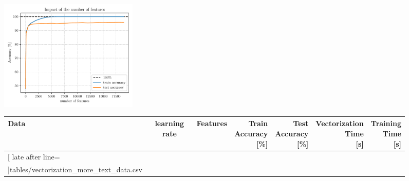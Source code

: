 \documentclass[10pt]{article}
\begin{document}
	\begin{figure}[htbp]
		\centering
		\begin{minipage}[t]{0.35\textwidth}
			\centering
			\vspace{0pt} %
			\includegraphics[height=5.3cm]{figures/vectorization_comparison_feature_number_impact.pdf}
			\subcaption{}
	
		\end{minipage}
		\hfill
		\begin{minipage}[t]{0.6\textwidth}
			\vspace{5pt} %
			
			\small
			\setlength{\tabcolsep}{4pt}
			\renewcommand{\arraystretch}{1.1}
			\begin{adjustbox}{scale=.8, valign=t}
				\begin{tabular}{|l|c|r|r|r|r|r|}
					\hline
					\rowcolor{gray!30}
					\bfseries Data & 
					\bfseries{learning rate} &
					\bfseries Features & 
					\bfseries \makecell{Train\\Accuracy\\{\footnotesize[\%]}} & 
					\bfseries \makecell{Test\\Accuracy\\{\footnotesize[\%]}} & 
					\bfseries \makecell{Vectorization\\Time\\{\footnotesize[s]}} & 
					\bfseries \makecell{Training\\Time\\{\footnotesize[s]}} \\
					\hline
					\csvreader[
					late after line=\\\hline
					]{tables/vectorization_more_text_data.csv}{}%
					{\csvcoli  & \csvcolii & \csvcoliii & \csvcoliv & \csvcolv & \csvcolvi & \csvcolvii}%
				\end{tabular}
			\end{adjustbox}
			\subcaption{}


\end{minipage}
\end{figure}
\end{document}

